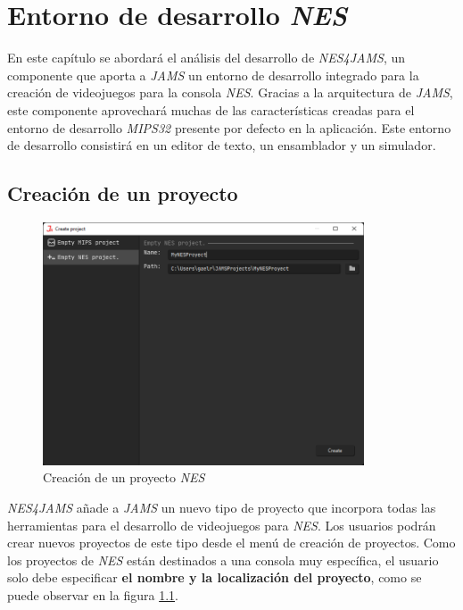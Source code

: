 \chapter{Entorno de desarrollo \textit{NES}}\label{ch:entorno-de-desarrollo-nes}

En este capítulo se abordará el análisis del desarrollo de \textit{NES4JAMS},
un componente que aporta a \textit{JAMS} un entorno de desarrollo
integrado para la creación de videojuegos para la consola
\textit{NES}.
Gracias a la arquitectura de \textit{JAMS}, este componente
aprovechará muchas de las características creadas
para el entorno de desarrollo \textit{MIPS32} presente
por defecto en la aplicación.
Este entorno de desarrollo consistirá en un editor
de texto, un ensamblador y un simulador.


\section{Creación de un proyecto}\label{sec:creacion-de-un-proyecto}

\begin{figure}[h]
    \centering
    \includegraphics[width=0.85\textwidth]{images/nes/nes-project-creation}
    \caption{Creación de un proyecto \textit{NES}}
    \label{fig:nes-project-creation}
\end{figure}

\textit{NES4JAMS} añade a \emph{JAMS} un nuevo tipo de proyecto
que incorpora todas las herramientas para el desarrollo
de videojuegos para \textit{NES}.
Los usuarios podrán crear nuevos proyectos de este tipo
desde el menú de creación de proyectos.
Como los proyectos de \textit{NES} están destinados
a una consola muy específica, el usuario solo debe
especificar \textbf{el nombre y la localización del proyecto},
como se puede observar en la figura \ref{fig:nes-project-creation}.

